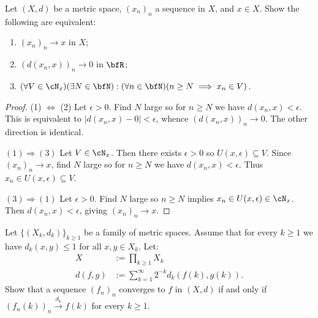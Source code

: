 \documentclass[11pt,twoside,openany]{memoir}
\begin{document}
    \begin{exercise}
        Let $(X,d)$ be a metric space, $(x_n)_n$ a sequence in $X$, and $x \in X$. Show the following are equivalent:
            \begin{enumerate}[label = (\arabic*),itemsep=1pt,topsep=3pt]
                \item $(x_n)_n \rightarrow x$ in $X$;
                \item $(d(x_n,x))_n \rightarrow 0$ in $\bfR$;
                \item $(\forall V \in \cN_x)(\exists N \in \bfN):(\forall n \in \bfN)(n \geq N \implies x_n \in V)$.
            \end{enumerate}
    \end{exercise}
        {\color{red} \begin{proof}
            (1) $\Leftrightarrow$ (2) Let $\epsilon > 0$. Find $N$ large so for $n \geq N$ we have $d(x_n,x) < \epsilon$. This is equivalent to $|d(x_n,x) - 0| < \epsilon$, whence $(d(x_n,x))_n \rightarrow 0$. The other direction is identical.

            $(1) \Rightarrow (3)$ Let $V \in \cN_x$. Then there exists $\epsilon > 0$ so $U(x,\epsilon) \subseteq V$. Since $(x_n)_n \rightarrow x$, find $N$ large so for $n \geq N$ we have $d(x_n,x) < \epsilon$. Thus $x_n \in U(x,\epsilon) \subseteq V$.

            $(3) \Rightarrow (1)$ Let $\epsilon > 0$. Find $N$ large so $n \geq N$ implies $x_n \in U(x, \epsilon) \in \cN_x$. Then $d(x_n,x) < \epsilon$, giving $(x_n)_n \rightarrow x$.
        \end{proof}}
    \iffalse
    \newpage
    \begin{exercise}
        Let $X$ be a metric space and $x_0 \in X$. Show that a sequence $(x_n)_n$ converges to $x_0$ in $X$ if and only if every subsequence $(x_{n_k})_k$ admits a subsequence $(x_{n_{k_j}})_j$ with $(x_{n_{k_j}})_j \rightarrow x_0$.
    \end{exercise}
    \fi
    \addtocounter{exercise}{1}
    \begin{exercise}
        Let $\{(X_k,d_k)\}_{k \geq 1}$ be a family of metric spaces. Assume that for every $k \geq 1$ we have $d_k(x,y) \leq 1$ for all $x,y \in X_k$. Let:
            \begin{equation*}
            \begin{split}
                X&:=\prod_{k \geq 1}X_k \\
                d(f,g) &:= \sum_{k = 1}^\infty 2^{-k}d_k(f(k),g(k)).
            \end{split}
            \end{equation*}
        Show that a sequence $(f_n)_n$ converges to $f$ in $(X,d)$ if and only if $(f_n(k))_n \xrightarrow{d_k}f(k)$ for every $k \geq 1$.
    \end{exercise}
\end{document}
